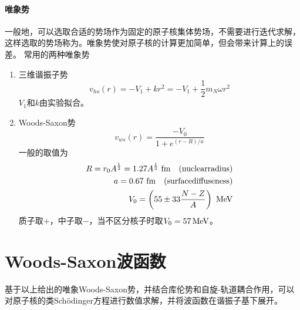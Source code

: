\paragraph*{唯象势}
一般地，可以选取合适的势场作为固定的原子核集体势场，不需要进行迭代求解，这样选取的势场称为。唯象势使对原子核的计算更加简单，但会带来计算上的误差。
常用的两种唯象势
\begin{enumerate}
	\item 三维谐振子势
		\begin{equation}
			v_{ho}(r) = -V_1 + k r^2 = -V_1 + \frac{1}{2} m_N \omega r^2
		\end{equation}
		$V_1$和$k$由实验拟合。
	\item Woods-Saxon势
		\begin{equation}
			v_{ws}(r) = \frac{-V_0}{1 + e^{(r-R)/a}}
		\end{equation}
	一般的取值为
	\begin{equation}
		\begin{aligned}
			R = r_0 A^{\frac{1}{3}} = 1.27  A^{\frac{1}{3}}\ \rm{fm} \quad (nuclear radius) \\
			a = 0.67\ \rm{fm} \quad (surface diffuseness) \\
			V_0 = \left(55 \pm 33 \frac{N - Z}{A}\right) \ \rm{MeV}
		\end{aligned}
	\end{equation}
	质子取$+$，中子取$-$，当不区分核子时取$V_0 = 57\,\rm{MeV}$。
\end{enumerate}


\section{Woods-Saxon波函数}
基于以上给出的唯象Woods-Saxon势，并结合库伦势和自旋-轨道耦合作用，可以对原子核的类Sch{\"o}dinger方程进行数值求解，并将波函数在谐振子基下展开。

